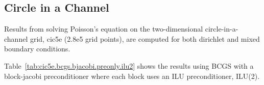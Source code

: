 % 

\clearpage
\subsection{Circle in a Channel}

Results from solving Poisson's equation on the two-dimensional circle-in-a-channel grid,
cic5e (2.8e5 grid points), are computed
for both dirichlet and mixed boundary conditions. 


Table~\ref{tab:cic5e.bcgs.bjacobi.preonly.ilu2}
shows the results using BCGS with a block-jacobi preconditioner where each
block uses an ILU preconditioner, ILU(2).


